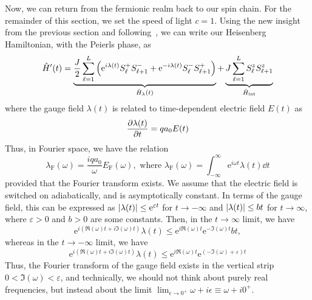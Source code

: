 Now, we can return from the fermionic realm back to our spin chain. For the remainder of this section, we set
the speed of light \(c = 1\). Using the new insight from the previous section and following~\textcite{Gohmann2022}, we can write our Heisenberg
Hamiltonian, with the Peierls phase, as
\begin{equation}
    \hat{H} ^{\prime}(t) = \underbrace{\frac{J}{2} \sum_{\ell=1}^{L} \left(\mathrm{e}^{i \lambda(t)} S^{+}_{\ell} S^{-}_{\ell+1} + \mathrm{e}^{-i \lambda(t)} S^{-}_{\ell}S^{+}_{\ell+1} \right)}_{\hat{H} _{\lambda }(t)}
    + \underbrace{J \sum_{\ell=1}^{L} S^{z}_{\ell}S^{z}_{\ell+1}}_{\hat{H} _{\text{int}}}
\end{equation}
where the gauge field \(\lambda(t)\) is related to time-dependent electric field \(E(t)\) as
\begin{equation}
    \pdv{\lambda(t)}{t} =  q a_0 E(t)
\end{equation}
Thus, in Fourier space, we have the relation
\begin{equation}
    \lambda_{\mathrm{F}} (\omega) = \frac{i q a_0}{\omega} E_{\mathrm{F}} (\omega), \text{ where } \lambda_{\mathrm{F}} (\omega) = \int_{-\infty}^{\infty} \mathrm{e}^{i \omega t} \lambda(t)\dd{t}
\end{equation}
provided that the Fourier transform exists. We assume that the electric field is switched on adiabatically, and
is asymptotically constant. In terms of the gauge field, this can be expressed as
\(\abs{\lambda (t)} \leq \mathrm{e}^{\varepsilon t} \) for \(t\to -\infty \) and
\(\abs{\lambda (t)} \leq b t \) for \(t\to \infty \), where \(\varepsilon > 0\) and \(b>0\) are some constants.
Then, in the \( t \to \infty \) limit, we have \[\mathrm{e}^{i (\Re(\omega) t + i \Im(\omega) t )} \lambda (t)
    \leq \mathrm{e}^{i \Re (\omega) t}  \mathrm{e}^{- \Im (\omega)  t} b t,\]
whereas in the \(t \to -\infty \) limit,
we have \[\mathrm{e}^{i (\Re (\omega) t + i \Im (\omega) t )} \lambda (t) \leq \mathrm{e}^{i \Re (\omega) t}
    \mathrm{e}^{(- \Im (\omega) + \varepsilon )t}\]
Thus, the Fourier transform of the gauge field exists in the
vertical strip \(0 < \Im (\omega) < \varepsilon \), and technically, we should not think about purely
real frequencies, but instead about the limit \(\lim_{\epsilon \to 0^+} \omega + i \epsilon \equiv \omega + i0^{+}  \).

